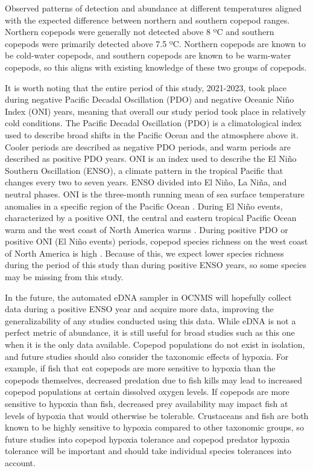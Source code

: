 \documentclass[12pt,twoside]{reedthesis}
\begin{document}
{	Observed patterns of detection and abundance at different temperatures aligned with the expected difference between northern and southern copepod ranges. Northern copepods were generally not detected above 8 ºC and southern copepods were primarily detected above 7.5 ºC. Northern copepods are known to be cold-water copepods, and southern copepods are known to be warm-water copepods, so this aligns with existing knowledge of these two groups of copepods. 
	
	It is worth noting that the entire period of this study, 2021-2023, took place during negative Pacific Decadal Oscillation (PDO) and negative Oceanic Niño Index (ONI) years, meaning that overall our study period took place in relatively cold conditions. The Pacific Decadal Oscillation (PDO) is a climatological index used to describe broad shifts in the Pacific Ocean and the atmosphere above it. Cooler periods are described as negative PDO periods, and warm periods are described as positive PDO years. ONI is an index used to describe the El Niño Southern Oscillation (ENSO), a climate pattern in the tropical Pacific that changes every two to seven years. ENSO divided into El Niño, La Niña, and neutral phases. ONI is the three-month running mean of sea surface temperature anomalies in a specific region of the Pacific Ocean \autocite{ClimatePredictionCenterInternetTeam}. During El Niño events, characterized by a positive ONI, the central and eastern tropical Pacific Ocean warm and the west coast of North America warms \autocite{LHeureux2014}. During positive PDO or positive ONI (El Niño events) periods, copepod species richness on the west coast of North America is high \autocite{NOAAFisheries2024}. Because of this, we expect lower species richness during the period of this study than during positive ENSO years, so some species may be missing from this study. 
	
	In the future, the automated eDNA sampler in OCNMS will hopefully collect data during a positive ENSO year and acquire more data, improving the generalizability of any studies conducted using this data. While eDNA is not a perfect metric of abundance, it is still useful for broad studies such as this one when it is the only data available. Copepod populations do not exist in isolation, and future studies should also consider the taxonomic effects of hypoxia. For example, if fish that eat copepods are more sensitive to hypoxia than the copepods themselves, decreased predation due to fish kills may lead to increased copepod populations at certain dissolved oxygen levels. If copepods are more sensitive to hypoxia than fish, decreased prey availability may impact fish at levels of hypoxia that would otherwise be tolerable. Crustaceans and fish are both known to be highly sensitive to hypoxia compared to other taxonomic groups, so future studies into copepod hypoxia tolerance and copepod predator hypoxia tolerance will be important and should take individual species tolerances into account.
   
}
\end{document}
